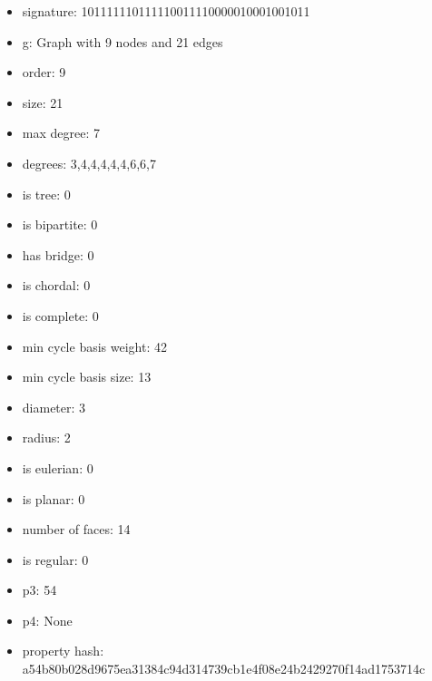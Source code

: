 \newpage
\begin{figure}
\end{figure}
\begin{itemize}
\item signature: 101111110111110011110000010001001011
\item g: Graph with 9 nodes and 21 edges
\item order: 9
\item size: 21
\item max degree: 7
\item degrees: 3,4,4,4,4,4,6,6,7
\item is tree: 0
\item is bipartite: 0
\item has bridge: 0
\item is chordal: 0
\item is complete: 0
\item min cycle basis weight: 42
\item min cycle basis size: 13
\item diameter: 3
\item radius: 2
\item is eulerian: 0
\item is planar: 0
\item number of faces: 14
\item is regular: 0
\item p3: 54
\item p4: None
\item property hash: a54b80b028d9675ea31384c94d314739cb1e4f08e24b2429270f14ad1753714c
\end{itemize}
